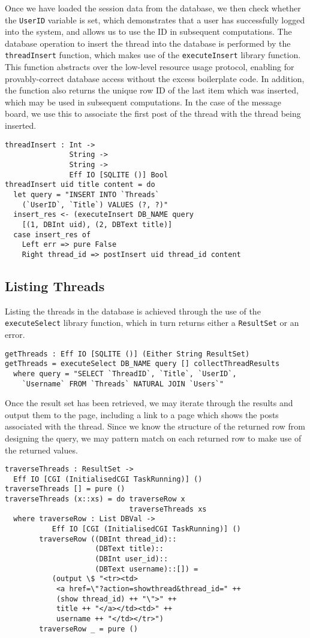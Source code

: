 \documentclass[preprint]{sigplanconf}
\begin{document}
Once we have loaded the session data from the database, we then check whether the \texttt{UserID} variable is set, which demonstrates that a user has successfully logged into the system, and allows us to use the ID in subsequent computations. The database operation to insert the thread into the database is performed by the \texttt{threadInsert} function, which makes use of the \texttt{executeInsert} library function. This function abstracts over the low-level resource usage protocol, enabling for provably-correct database access without the excess boilerplate code. In addition, the function also returns the unique row ID of the last item which was inserted, which may be used in subsequent computations. In the case of the message board, we use this to associate the first post of the thread with the thread being inserted.
{\small
\begin{verbatim}
threadInsert : Int -> 
               String -> 
               String -> 
               Eff IO [SQLITE ()] Bool
threadInsert uid title content = do
  let query = "INSERT INTO `Threads` 
    (`UserID`, `Title`) VALUES (?, ?)"
  insert_res <- (executeInsert DB_NAME query 
    [(1, DBInt uid), (2, DBText title)]
  case insert_res of
    Left err => pure False
    Right thread_id => postInsert uid thread_id content
\end{verbatim}
}
\subsection{Listing Threads}
Listing the threads in the database is achieved through the use of the \texttt{executeSelect} library function, which in turn returns either a \texttt{ResultSet} or an error. 
{\small
\begin{verbatim}
getThreads : Eff IO [SQLITE ()] (Either String ResultSet)
getThreads = executeSelect DB_NAME query [] collectThreadResults
  where query = "SELECT `ThreadID`, `Title`, `UserID`, 
    `Username` FROM `Threads` NATURAL JOIN `Users`"
\end{verbatim}
}
Once the result set has been retrieved, we may iterate through the results and output them to the page, including a link to a page which shows the posts associated with the thread. Since we know the structure of the returned row from designing the query, we may pattern match on each returned row to make use of the returned values.
{\small
\begin{verbatim}
traverseThreads : ResultSet -> 
  Eff IO [CGI (InitialisedCGI TaskRunning)] ()
traverseThreads [] = pure ()
traverseThreads (x::xs) = do traverseRow x
                             traverseThreads xs
  where traverseRow : List DBVal -> 
           Eff IO [CGI (InitialisedCGI TaskRunning)] ()
        traverseRow ((DBInt thread_id)::
                     (DBText title)::
                     (DBInt user_id)::
                     (DBText username)::[]) =
           (output \$ "<tr><td>
            <a href=\"?action=showthread&thread_id=" ++ 
            (show thread_id) ++ "\">" ++ 
            title ++ "</a></td><td>" ++ 
            username ++ "</td></tr>") 
        traverseRow _ = pure ()
\end{verbatim}
}
\end{document}
